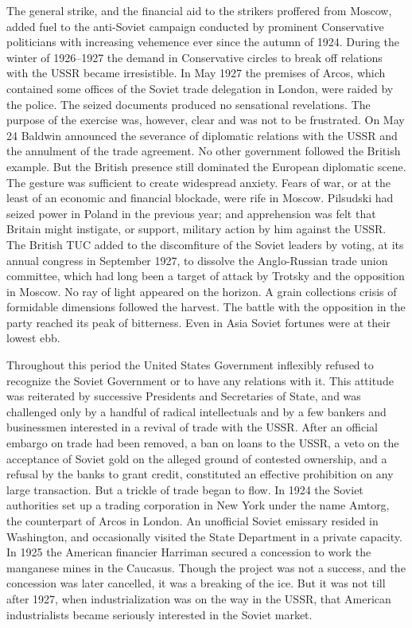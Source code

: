The general strike, and the financial aid to the strikers proffered from Moscow, added fuel to the anti-Soviet campaign conducted by prominent Conservative politicians with increasing vehemence ever since the autumn of 1924. During the winter of 1926--1927 the demand in Conservative circles to break off relations with the USSR became irresistible. In May 1927 the premises of Arcos, which contained some offices of the Soviet trade delegation in London, were raided by the police. The seized documents produced no sensational revelations. The purpose of the exercise was, however, clear and was not to be frustrated. On May 24 Baldwin announced the severance of diplomatic relations with the USSR and the annulment of the trade agreement. No other government followed the British example. But the British presence still dominated the European diplomatic scene. The gesture was sufficient to create widespread anxiety. Fears of war, or at the least of an economic and financial blockade, were rife in Moscow. Pilsudski had seized power in Poland in the previous year; and apprehension was felt that Britain might instigate, or support, military action by him against the USSR. The British TUC added to the discomfiture of the Soviet leaders by voting, at its annual congress in September 1927, to dissolve the Anglo-Russian trade union committee, which had long been a target of attack by Trotsky and the opposition in Moscow. No ray of light appeared on the horizon. A grain collections crisis of formidable dimensions followed the harvest. The battle with the opposition in the party reached its peak of bitterness. Even in Asia Soviet fortunes were at their lowest ebb. 

Throughout this period the United States Government inflexibly refused to recognize the Soviet Government or to have any relations with it. This attitude was reiterated by successive Presidents and Secretaries of State, and was challenged only by a handful of radical intellectuals and by a few bankers and businessmen interested in a revival of trade with the USSR. After an official embargo on trade had been removed, a ban on loans to the USSR, a veto on the acceptance of Soviet gold on the alleged ground of contested ownership, and a refusal by the banks to grant credit, constituted an effective prohibition on any large transaction. But a trickle of trade began to flow. In 1924 the Soviet authorities set up a trading corporation in New York under the name Amtorg, the counterpart of Arcos in London. An unofficial Soviet emissary resided in Washington, and occasionally visited the State Department in a private capacity. In 1925 the American financier Harriman secured a concession to work the manganese mines in the Caucasus. Though the project was not a success, and the concession was later cancelled, it was a breaking of the ice. But it was not till after 1927, when industrialization was on the way in the USSR, that American industrialists became seriously interested in the Soviet market. 
